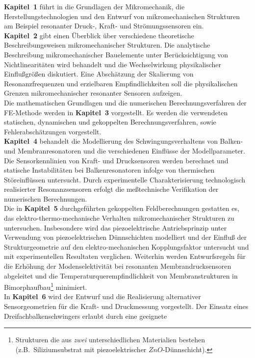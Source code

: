 {\bf Kapitel~1} führt in die Grundlagen der Mikromechanik, die
Herstellungstechnologien und den Entwurf von mikromechanischen Strukturen
am Beispiel resonanter Druck-, Kraft- und Strömungssensoren ein.\\
%
{\bf Kapitel~2} gibt einen Überblick über verschiedene theoretische
Beschreibungsweisen mikro\-mechanischer Strukturen. Die analytische
Beschreibung mikromechanischer Bauelemente unter Berücksichtigung von
Nichtlinearitäten wird behandelt und die Wechselwirkung
physikalischer Einflußgrößen diskutiert. Eine Abschätzung der Skalierung
von Resonanzfrequenzen und erzielbaren Empfindlichkeiten soll die
physikalischen Grenzen mikromechanischer resonanter Sensoren aufzeigen.\\
%
Die mathematischen Grundlagen und die numerischen Berechnungsverfahren der
FE-Methode werden in {\bf Kapitel~3} vorgestellt. Es werden die verwendeten
statischen, dynamischen und gekoppelten Berechnungsverfahren, sowie
Fehlerabschätzungen vorgestellt.\\ %
%
{\bf Kapitel~4} behandelt die Modellierung des
Schwingungsverhaltens von Balken- und Membranresonatoren und die
verschiedenen Einflüsse der Modellparameter. Die Sensorkenn\-linien
von Kraft- und Drucksensoren werden berechnet und statische
Instabilitäten bei Balkenresonatoren infolge von thermischen
Störeinflüssen untersucht. Durch experimentelle Charakterisierung
technologisch realisierter Resonanzsensoren erfolgt die meßtechnische
Verifikation der numerischen Berechnungen.\\
%
Die in {\bf Kapitel~5} durchgeführten gekoppelten Feldberechnungen gestatten
es, das elektro-thermo-mechanische Verhalten mikromechanischer Strukturen zu
untersuchen. Insbesondere wird das piezoelektrische Antriebs\-prinzip unter
Verwendung von piezoelektrischen Dünnschichten modelliert und der Einfluß
der Strukturgeometrie auf den elektro-mechanischen Kopplungsfaktor untersucht
und mit experimentellen Resultaten verglichen.
Weiterhin werden Entwurfsregeln für die Erhöhung der Modenselektivität bei
resonanten Membrandrucksensoren abgeleitet und die
Temperaturquerempfindlichkeit von Membranstrukturen in
Bimorphaufbau\footnote{Strukturen die aus {\em zwei} unterschiedlichen
Materialien bestehen (z.B.\ Siliziumsubstrat mit piezoelektrischer
$ZnO$-Dünnschicht).} minimiert.\\
%
In {\bf Kapitel~6} wird der Entwurf und die Realisierung alternativer
Sensorgeometrien für die Kraft- und Druckmessung vorgestellt.
Der Einsatz eines Dreifachbalkenschwingers erlaubt durch eine geeignete
